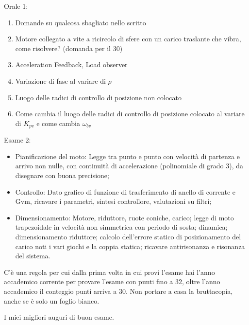 Orale 1:
\begin{enumerate}
    \item Domande su qualcosa sbagliato nello scritto
    \item Motore collegato a vite a ricircolo di sfere con un carico traslante che vibra, come risolvere? (domanda per il 30)
    \item Acceleration Feedback, Load observer
    \item Variazione di fase al variare di \(\rho\)
    \item Luogo delle radici di controllo di posizione non colocato
    \item Come cambia il luogo delle radici di controllo di posizione colocato al variare di \(K_{pv}\) e come cambia \(\omega_{bv}\)
\end{enumerate}

Esame 2:
\begin{itemize}
    \item Pianificazione del moto: Legge tra punto e punto con velocità di partenza e arrivo non nulle, con continuità di accelerazione (polinomiale di grado 3), da disegnare con buona precisione;
    \item Controllo: Dato grafico di funzione di trasferimento di anello di corrente e Gvm, ricavare i parametri, sintesi controllore, valutazioni su filtri;
    \item Dimensionamento: Motore, riduttore, ruote coniche, carico; legge di moto trapezoidale in velocità non simmetrica con periodo di sosta; dinamica; dimensionamento riduttore; calcolo dell'errore statico di posizionamento del carico noti i vari giochi e la coppia statica; ricavare antirisonanza e risonanza del sistema.
\end{itemize}

C'è una regola per cui dalla prima volta in cui provi l'esame hai l'anno accademico corrente per provare l'esame con punti fino a 32, oltre l'anno accademico il conteggio punti arriva a 30.
Non portare a casa la bruttacopia, anche se è solo un foglio bianco.

\vspace{5pt}

I miei migliori auguri di buon esame.
